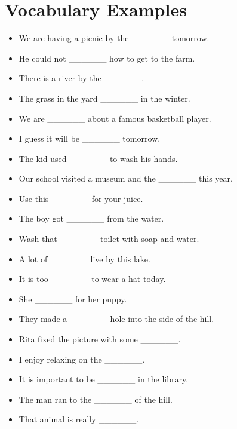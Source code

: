 \documentclass{article}
\begin{document}
\section*{Vocabulary Examples}
\begin{addmargin}[1em]{1em}
\begin{itemize}
    \item We are having a picnic by the \_\_\_\_\_\_ tomorrow.
    \item He could not \_\_\_\_\_\_ how to get to the farm.
    \item There is a river by the \_\_\_\_\_\_.
    \item The grass in the yard \_\_\_\_\_\_ in the winter.
    \item We are \_\_\_\_\_\_ about a famous basketball player.
    \item I guess it will be \_\_\_\_\_\_ tomorrow.
    \item The kid used \_\_\_\_\_\_ to wash his hands.
    \item Our school visited a museum and the \_\_\_\_\_\_ this year.
    \item Use this \_\_\_\_\_\_ for your juice.
    \item The boy got \_\_\_\_\_\_ from the water.
    \item Wash that \_\_\_\_\_\_ toilet with soap and water.
    \item A lot of \_\_\_\_\_\_ live by this lake.
    \item It is too \_\_\_\_\_\_ to wear a hat today.
    \item She \_\_\_\_\_\_ for her puppy.
    \item They made a \_\_\_\_\_\_ hole into the side of the hill.
    \item Rita fixed the picture with some \_\_\_\_\_\_.
    \item I enjoy relaxing on the \_\_\_\_\_\_.
    \item It is important to be \_\_\_\_\_\_ in the library.
    \item The man ran to the \_\_\_\_\_\_ of the hill.
    \item That animal is really \_\_\_\_\_\_.
\end{itemize}
\end{addmargin}
\end{document}
